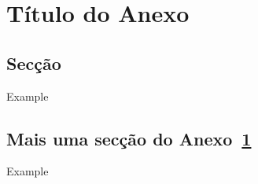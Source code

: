 
\chapter{Título do Anexo} %
\label{AppendixA} %

\section{Secção}

Example

\section{Mais uma secção do Anexo~\ref{AppendixA}}

Example

